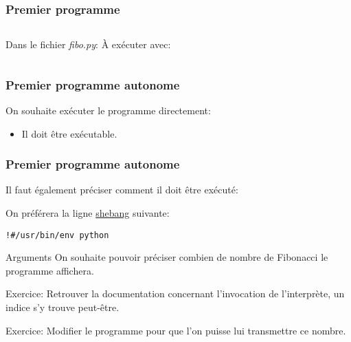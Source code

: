 \documentclass{beamer}
\begin{document}
\begin{frame}[fragile]\frametitle{Premier programme}
  \begin{columns}
    Dans le fichier {\it fibo.py}:\newline
    \fbox{}
    À exécuter avec:
    \fbox{}
  \end{columns}
\end{frame}

\begin{frame}[fragile]\frametitle{Premier programme autonome}
  On souhaite exécuter le programme directement:
  \begin{itemize}
  \item Il doit être exécutable.
  \end{itemize}
  \fbox{}
\end{frame}

\begin{frame}[fragile]\frametitle{Premier programme autonome}
  Il faut également préciser comment il doit être exécuté:
  \fbox{}

  On préférera la ligne \href{https://en.wikipedia.org/wiki/Shebang_(Unix)}{shebang} suivante:
\begin{verbatim}
!#/usr/bin/env python
\end{verbatim}
\end{frame}

\begin{frame}{Arguments}
  On souhaite pouvoir préciser combien de nombre de Fibonacci le programme affichera.

  Exercice: Retrouver la documentation concernant l'invocation de l'interprète, un indice s'y trouve peut-être.
  
  
  
  Exercice: Modifier le programme pour que l'on puisse lui transmettre ce nombre. 
\end{frame}
\end{document}
